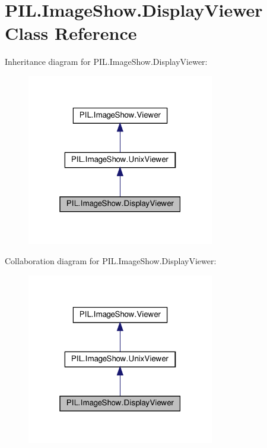 \hypertarget{classPIL_1_1ImageShow_1_1DisplayViewer}{}\section{P\+I\+L.\+Image\+Show.\+Display\+Viewer Class Reference}
\label{classPIL_1_1ImageShow_1_1DisplayViewer}


Inheritance diagram for P\+I\+L.\+Image\+Show.\+Display\+Viewer\+:
\nopagebreak
\begin{figure}[H]
\begin{center}
\leavevmode
\includegraphics[width=232pt]{classPIL_1_1ImageShow_1_1DisplayViewer__inherit__graph}
\end{center}
\end{figure}


Collaboration diagram for P\+I\+L.\+Image\+Show.\+Display\+Viewer\+:
\nopagebreak
\begin{figure}[H]
\begin{center}
\leavevmode
\includegraphics[width=232pt]{classPIL_1_1ImageShow_1_1DisplayViewer__coll__graph}
\end{center}
\end{figure}
